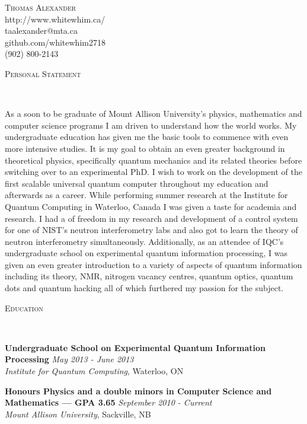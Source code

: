 \documentclass[9pt]{article}
\newenvironment{changemargin}[2]{%
  \begin{list}{}{%
    \setlength{\topsep}{0pt}%
    \setlength{\leftmargin}{#1}%
    \setlength{\rightmargin}{#2}%
    \setlength{\listparindent}{\parindent}%
    \setlength{\itemindent}{\parindent}%
    \setlength{\parsep}{\parskip}%
  }%
  \item[]}{\end{list}
}
\newcommand{\lineover}{
	\begin{changemargin}{-0.05in}{-0.05in}
		\vspace*{-8pt}
		\hrulefill \\
		\vspace*{-2pt}
	\end{changemargin}
}
\newcommand{\header}[1]{
	\begin{changemargin}{-0.5in}{-0.5in}
		\scshape{#1}\\
  	\lineover
	\end{changemargin}
}
\newcommand{\contact}[5]{
	\begin{changemargin}{-0.5in}{-0.5in}
		\begin{center}
			{\Large \scshape {#1}}\\ \smallskip
			{#2}\\ \smallskip 
			{#3}\\ \smallskip
			{#5}\\ \smallskip
			{#4}\smallskip
		\end{center}
	\end{changemargin}
}
\newenvironment{body} {
	\vspace*{-16pt}
	\begin{changemargin}{-0.25in}{-0.5in}
  }	
	{\end{changemargin}
}
\begin{document}
\contact{Thomas Alexander}{http://www.whitewhim.ca/}{taalexander@mta.ca}{(902) 800-2143}{github.com/whitewhim2718}


\header{Personal Statement}

\begin{body}
	\vspace{14pt}
	As a soon to be graduate of Mount Allison University's physics, mathematics and computer science programs I am driven to understand how the world works. My undergraduate education has given me the basic tools to commence with even more intensive studies. It is my goal to obtain an even greater background in theoretical physics, specifically quantum mechanics and its related theories before switching over to an experimental PhD. I wish to work on the development of the first scalable universal quantum computer throughout my education and afterwards as a career. 
	While performing summer research at the Institute for Quantum Computing in Waterloo, Canada I was given a taste for academia and research. I had a of freedom in my research and development of a control system for one of NIST's neutron interferometry labs and also got to learn the theory of neutron interferometry simultaneously. Additionally, as an attendee of IQC's undergraduate school on experimental quantum information processing, I was given an even greater introduction to a variety of aspects of quantum information including its theory, NMR, nitrogen vacancy centres, quantum optics, quantum dots and quantum hacking all of which furthered my passion for the subject. 
	
\end{body}

\smallskip


\header{Education}
\begin{body}
	\vspace{14pt}
	\textbf{Undergraduate School on Experimental Quantum Information Processing}{} \hfill \emph{May 2013 - June 2013}{} \\
	\emph{Institute for Quantum Computing}, Waterloo, ON{} \\
  
\end{body}
\begin{body}
	\vspace{14pt}
	\textbf{Honours Physics and a double minors in Computer Science and Mathematics --- GPA 3.65 }{} \hfill \emph{September 2010 - Current}{} \\
	\emph{Mount Allison University}, Sackville, NB{} \\
  
\end{body}
\end{document}

